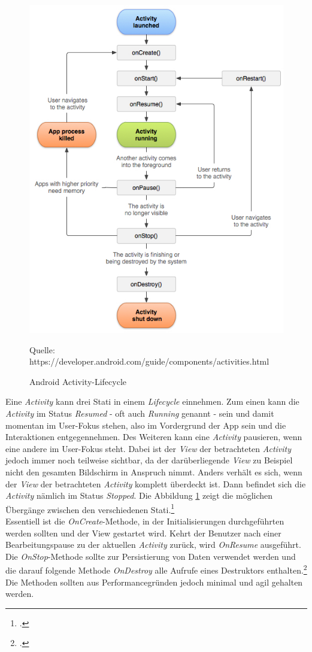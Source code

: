 \begin{figure}[!htbp]
\centering
\includegraphics[width=0.8\linewidth]{content/images/Android-ActivityLifecycle}
\caption{Android Activity-Lifecycle}
Quelle: https://developer.android.com/guide/components/activities.html
\label{pic:androidActivityLifecycle}
\end{figure}
Eine \textit{Activity} kann drei Stati in einem \textit{Lifecycle} einnehmen. Zum einen kann die \textit{Activity} im Status \textit{Resumed} - oft auch \textit{Running} genannt - sein und damit momentan im User-Fokus stehen, also im Vordergrund der App sein und die Interaktionen entgegennehmen. Des Weiteren kann eine \textit{Activity} pausieren, wenn eine andere im User-Fokus steht. Dabei ist der \textit{View} der betrachteten \textit{Activity} jedoch immer noch teilweise sichtbar, da der darüberliegende \textit{View} zu Beispiel nicht den gesamten Bildschirm in Anspruch nimmt. Anders verhält es sich, wenn der \textit{View} der betrachteten \textit{Activity} komplett überdeckt ist. Dann befindet sich die \textit{Activity} nämlich im Status \textit{Stopped}. Die Abbildung \ref{pic:androidActivityLifecycle} zeigt die möglichen Übergänge zwischen den verschiedenen Stati.\footcite{Android-Activities}\\
Essentiell ist die \textit{OnCreate}-Methode, in der Initialisierungen durchgeführten werden sollten und der View gestartet wird. Kehrt der Benutzer nach einer Bearbeitungspause zu der aktuellen \textit{Activity} zurück, wird \textit{OnResume} ausgeführt.\\
Die \textit{OnStop}-Methode sollte zur Persistierung von Daten verwendet werden und die darauf folgende Methode \textit{OnDestroy} alle Aufrufe eines Destruktors enthalten.\footcite[S. 289]{Android-BeckerPant}\\
Die Methoden sollten aus Performancegründen jedoch minimal und agil gehalten werden.
